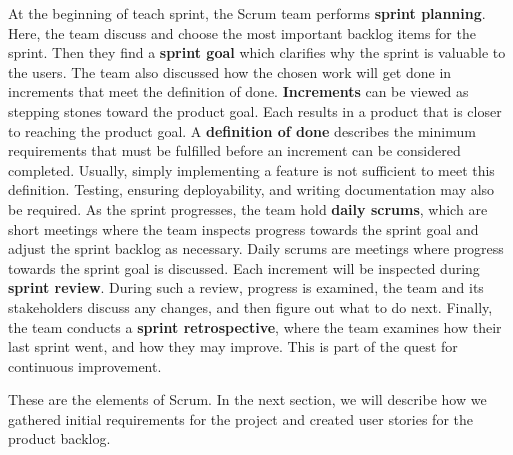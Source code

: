 At the beginning of teach sprint, the Scrum team performs \textbf{sprint planning}. Here, the team discuss and choose the most important backlog items for the sprint. Then they find a \textbf{sprint goal} which clarifies why the sprint is valuable to the users. The team also discussed how the chosen work will get done in increments that meet the definition of done. \textbf{Increments} can be viewed as stepping stones toward the product goal. Each results in a product that is closer to reaching the product goal. A \textbf{definition of done} describes the minimum requirements that must be fulfilled before an increment can be considered completed. Usually, simply implementing a feature is not sufficient to meet this definition. Testing, ensuring deployability, and writing documentation may also be required.
As the sprint progresses, the team hold \textbf{daily scrums}, which are short meetings where the team inspects progress towards the sprint goal and adjust the sprint backlog as necessary.
Daily scrums are meetings where progress towards the sprint goal is discussed.
Each increment will be inspected during \textbf{sprint review}. During such a review, progress is examined, the team and its stakeholders discuss any changes, and then figure out what to do next.
Finally, the team conducts a \textbf{sprint retrospective}, where the team examines how their last sprint went, and how they may improve. This is part of the quest for continuous improvement.\cite{sutherlandScrumArtDoing2014}

These are the elements of Scrum. In the next section, we will describe how we gathered initial requirements for the project and created user stories for the product backlog.